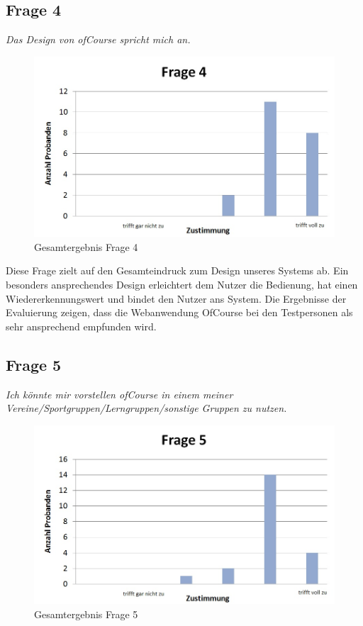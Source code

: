 \subsection{Frage 4}
\begin{center}
	{\it Das Design von ofCourse spricht mich an.}
\end{center}
\begin{figure}[h]
\centering
\includegraphics[width=0.7\linewidth]{img/Frage4}
\caption{Gesamtergebnis Frage 4}
\label{fig:Frage4}
\end{figure}
Diese Frage zielt auf den Gesamteindruck zum Design unseres Systems ab. Ein besonders ansprechendes Design erleichtert dem Nutzer die Bedienung, hat einen Wiedererkennungswert und bindet den Nutzer ans System. Die Ergebnisse der Evaluierung zeigen, dass die Webanwendung OfCourse bei den Testpersonen als sehr ansprechend empfunden wird.

\subsection{Frage 5}
\begin{center}
	{\it Ich könnte mir vorstellen ofCourse in einem meiner Vereine/Sportgruppen/Lerngruppen/sonstige Gruppen zu nutzen.}
\end{center}
\begin{figure}[h]
\centering
\includegraphics[width=0.7\linewidth]{img/Frage5}
\caption{Gesamtergebnis Frage 5}
\label{fig:Frage5}
\end{figure}


